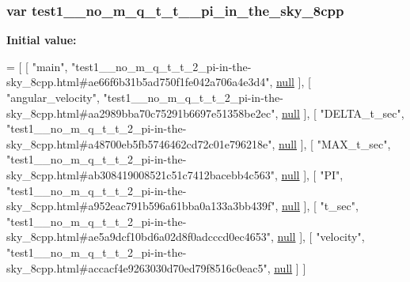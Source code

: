 \subsubsection[{\texorpdfstring{test1\+\_\+\+\_\+no\+\_\+m\+\_\+q\+\_\+t\+\_\+t\+\_\+2\+\_\+pi\+\_\+in\+\_\+the\+\_\+sky\+\_\+8cpp}{test1__no_m_q_t_t_2_pi_in_the_sky_8cpp}}]{\setlength{\rightskip}{0pt plus 5cm}var test1\+\_\+\+\_\+no\+\_\+m\+\_\+q\+\_\+t\+\_\+t\+\_\+\_\+pi\+\_\+in\+\_\+the\+\_\+sky\+\_\+8cpp}\hypertarget{test1____no__m__q__t__t__2__pi-in-the-sky__8cpp_8js_a405e2a9063c7eafb9c94ad3c55036fcb}{}\label{test1____no__m__q__t__t__2__pi-in-the-sky__8cpp_8js_a405e2a9063c7eafb9c94ad3c55036fcb}
{\bfseries Initial value\+:}
\begin{DoxyCode}
=
[
    [ \textcolor{stringliteral}{"main"}, \textcolor{stringliteral}{"test1\_\_no\_m\_q\_t\_t\_2\_pi-in-the-sky\_8cpp.html#ae66f6b31b5ad750f1fe042a706a4e3d4"}, 
      \hyperlink{namespacenlohmann_1_1detail_a1ed8fc6239da25abcaf681d30ace4985a37a6259cc0c1dae299a7866489dff0bd}{null} ],
    [ \textcolor{stringliteral}{"angular\_velocity"}, \textcolor{stringliteral}{"test1\_\_no\_m\_q\_t\_t\_2\_pi-in-the-sky\_8cpp.html#aa2989bba70c75291b6697e51358be2ec"}, 
      \hyperlink{namespacenlohmann_1_1detail_a1ed8fc6239da25abcaf681d30ace4985a37a6259cc0c1dae299a7866489dff0bd}{null} ],
    [ \textcolor{stringliteral}{"DELTA\_t\_sec"}, \textcolor{stringliteral}{"test1\_\_no\_m\_q\_t\_t\_2\_pi-in-the-sky\_8cpp.html#a48700eb5fb5746462cd72c01e796218e"}, 
      \hyperlink{namespacenlohmann_1_1detail_a1ed8fc6239da25abcaf681d30ace4985a37a6259cc0c1dae299a7866489dff0bd}{null} ],
    [ \textcolor{stringliteral}{"MAX\_t\_sec"}, \textcolor{stringliteral}{"test1\_\_no\_m\_q\_t\_t\_2\_pi-in-the-sky\_8cpp.html#ab308419008521c51c7412bacebb4c563"}, 
      \hyperlink{namespacenlohmann_1_1detail_a1ed8fc6239da25abcaf681d30ace4985a37a6259cc0c1dae299a7866489dff0bd}{null} ],
    [ \textcolor{stringliteral}{"PI"}, \textcolor{stringliteral}{"test1\_\_no\_m\_q\_t\_t\_2\_pi-in-the-sky\_8cpp.html#a952eac791b596a61bba0a133a3bb439f"}, 
      \hyperlink{namespacenlohmann_1_1detail_a1ed8fc6239da25abcaf681d30ace4985a37a6259cc0c1dae299a7866489dff0bd}{null} ],
    [ \textcolor{stringliteral}{"t\_sec"}, \textcolor{stringliteral}{"test1\_\_no\_m\_q\_t\_t\_2\_pi-in-the-sky\_8cpp.html#ae5a9dcf10bd6a02d8f0adcccd0ec4653"}, 
      \hyperlink{namespacenlohmann_1_1detail_a1ed8fc6239da25abcaf681d30ace4985a37a6259cc0c1dae299a7866489dff0bd}{null} ],
    [ \textcolor{stringliteral}{"velocity"}, \textcolor{stringliteral}{"test1\_\_no\_m\_q\_t\_t\_2\_pi-in-the-sky\_8cpp.html#accacf4e9263030d70ed79f8516c0eac5"}, 
      \hyperlink{namespacenlohmann_1_1detail_a1ed8fc6239da25abcaf681d30ace4985a37a6259cc0c1dae299a7866489dff0bd}{null} ]
]
\end{DoxyCode}

